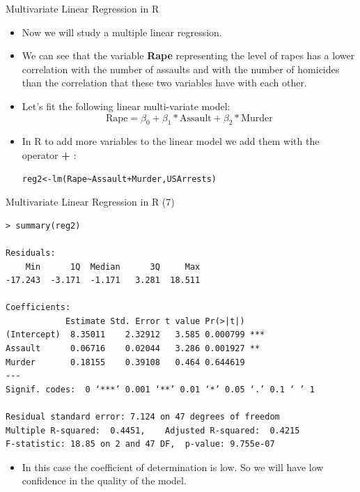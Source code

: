 \documentclass[handout]{beamer}
\begin{document}
\begin{frame}[fragile]{Multivariate Linear Regression in R}
\scriptsize{
\begin{itemize}
 \item  Now we will study a multiple linear regression.
 \item We can see that the variable \textbf{Rape} representing the level of rapes has a lower correlation with the number of assaults and with the number of homicides than the correlation that these two variables have with each other.
 \item  Let's fit the following linear multi-variate model:
 \begin{displaymath}
 \text{Rape}=\beta_{0}+\beta_{1}*\text{Assault}+\beta_{2}*\text{Murder}
 \end{displaymath}
 \item In R to add more variables to the linear model we add them with the operator \textbf{+} :
\begin{verbatim}
reg2<-lm(Rape~Assault+Murder,USArrests)
\end{verbatim}



 
 \end{itemize}
 

} 
\end{frame}


\begin{frame}[fragile]{Multivariate Linear Regression in R (7)}
\scriptsize{

\begin{verbatim}
> summary(reg2)

Residuals:
    Min      1Q  Median      3Q     Max 
-17.243  -3.171  -1.171   3.281  18.511 

Coefficients:
            Estimate Std. Error t value Pr(>|t|)    
(Intercept)  8.35011    2.32912   3.585 0.000799 ***
Assault      0.06716    0.02044   3.286 0.001927 ** 
Murder       0.18155    0.39108   0.464 0.644619    
---
Signif. codes:  0 ‘***’ 0.001 ‘**’ 0.01 ‘*’ 0.05 ‘.’ 0.1 ‘ ’ 1

Residual standard error: 7.124 on 47 degrees of freedom
Multiple R-squared:  0.4451,	Adjusted R-squared:  0.4215 
F-statistic: 18.85 on 2 and 47 DF,  p-value: 9.755e-07

\end{verbatim}

\begin{itemize}
\item In this case the coefficient of determination is low. So we will have low confidence in the quality of the model.
 \end{itemize}
 

} 
\end{frame}
\end{document}
